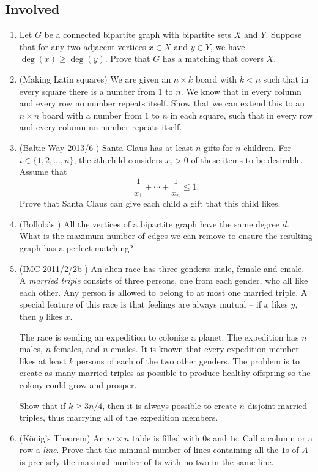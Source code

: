 \documentclass[11pt,paper=letter]{scrartcl}
\begin{document}
\subsection{Involved}

\begin{enumerate}

\item Let $G$ be a connected bipartite graph with bipartite sets $X$ and $Y$. Suppose that for any two adjacent vertices $x \in X$ and $y \in Y$, we have $\deg(x) \geq \deg(y)$. Prove that $G$ has a matching that covers $X$.

\item (Making Latin squares) We are given an $n \times k$ board with $k < n$ such that in every square there is a number from $1$ to $n$. We know that in every column and every row no number repeats itself. Show that we can extend this to an $n \times n$ board with a number from $1$ to $n$ in each square, such that in every row and every column no number repeats itself.

\item (Baltic Way 2013/6 \cite{baltic}) Santa Claus has at least $n$ gifts for $n$ children. For $i\in\{1,2, ... , n\}$, the $i$th child considers $x_i > 0$ of these items to be desirable. Assume that $$\dfrac{1}{x_1}+\cdots+\dfrac{1}{x_n}\le1.$$ Prove that Santa Claus can give each child a gift that this child likes. 

\item (Bollob\'as \cite{bollobas}) All the vertices of a bipartite graph have the same degree $d$. What is the maximum number of edges we can remove to ensure the resulting graph has a perfect matching?

\item (IMC 2011/2/2b \cite{imc}) An alien race has three genders: male, female and emale. A \emph{married triple} consists of three persons, one from each gender, who all like each other. Any person is allowed to belong to at most one married triple. A special feature of this race is that feelings are always mutual -- if $x$ likes $y$, then $y$ likes $x$.

The race is sending an expedition to colonize a planet. The expedition has $n$ males, $n$ females, and $n$ emales. It is known that every expedition member likes at least $k$ persons of each of the two other genders. The problem is to create as many married triples as possible to produce healthy offspring so the colony could grow and prosper.

Show that if $k \geq 3n/4$, then it is always possible to create $n$ disjoint married triples, thus marrying all of the expedition members.

\item (K\"onig's Theorem) An $m \times n$ table is filled with $0$s and $1$s. Call a column or a row a \emph{line}. Prove that the minimal number of lines containing all the $1$s of $A$ is precisely the maximal number of $1$s with no two in the same line.

\end{enumerate}
\end{document}
